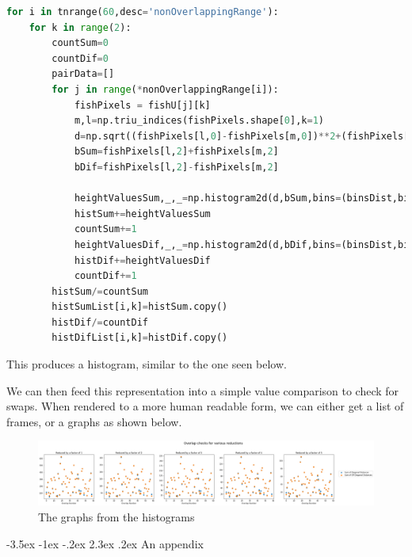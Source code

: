 \documentclass{article}
\makeatletter
\renewcommand\section{\clearpage\newpage\@startsection {section}{1}{\z@}%
	{-3.5ex \@plus -1ex \@minus -.2ex}%
	{2.3ex \@plus.2ex}%
	{\normalfont\Large\bfseries}}
\makeatother
\begin{document}
\begin{minipage}[c]{\textwidth}
\begin{lstlisting}[language=Python]
for i in tnrange(60,desc='nonOverlappingRange'):
    for k in range(2):
        countSum=0
        countDif=0
        pairData=[]
        for j in range(*nonOverlappingRange[i]):
            fishPixels = fishU[j][k]
            m,l=np.triu_indices(fishPixels.shape[0],k=1)
            d=np.sqrt((fishPixels[l,0]-fishPixels[m,0])**2+(fishPixels[l,1]-fishPixels[m,1])**2)
            bSum=fishPixels[l,2]+fishPixels[m,2]
            bDif=fishPixels[l,2]-fishPixels[m,2]

            heightValuesSum,_,_=np.histogram2d(d,bSum,bins=(binsDist,binsSum))
            histSum+=heightValuesSum
            countSum+=1
            heightValuesDif,_,_=np.histogram2d(d,bDif,bins=(binsDist,binsDif))
            histDif+=heightValuesDif
            countDif+=1
        histSum/=countSum
        histSumList[i,k]=histSum.copy()
        histDif/=countDif
        histDifList[i,k]=histDif.copy()
\end{lstlisting}
\end{minipage}

This produces a histogram, similar to the one seen below.

We can then feed this representation into a simple value comparison to check for swaps. When rendered to a more human readable form, we can either get a list of frames, or a graphs as shown below.

\begin{figure}[H]
	\centering
	\includegraphics[width=\linewidth]{reducedGraph}
	\caption{The graphs from the histograms}
	\label{fig:reducedGraph}
\end{figure}


\appendix
\section{An appendix}


%
%
\end{document}
